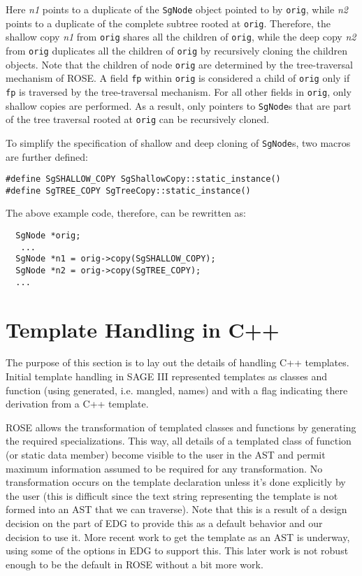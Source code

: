 Here {\it n1} points to a duplicate of the {\tt SgNode} object pointed to by {\tt orig},
while {\it n2} points to a duplicate of the complete subtree rooted at {\tt orig}.
Therefore, the shallow copy {\it n1} from {\tt orig} shares all the children 
of {\tt orig}, while the deep copy {\it n2} from {\tt orig} duplicates all the children 
of {\tt orig} by recursively cloning the children objects. 
Note that the children of node {\tt orig} are determined by the tree-traversal
mechanism of ROSE. A field {\tt fp} within {\tt orig} is considered a child of {\tt orig}
only if {\tt fp} is traversed by the tree-traversal mechanism. 
For all other fields in {\tt orig}, only shallow copies are performed. 
As a result, only pointers to {\tt SgNode}s that are part of
the tree traversal rooted at {\tt orig} can be recursively cloned. 
 
To simplify the specification of shallow and deep cloning
of {\tt SgNode}s, two macros are further defined:

{\indent
{\mySmallFontSize

\begin{verbatim}
#define SgSHALLOW_COPY SgShallowCopy::static_instance()
#define SgTREE_COPY SgTreeCopy::static_instance()
\end{verbatim}
}}

The above example code, therefore, can be rewritten as:

{\indent
{\mySmallFontSize

\begin{verbatim}
  SgNode *orig;
   ...
  SgNode *n1 = orig->copy(SgSHALLOW_COPY);
  SgNode *n2 = orig->copy(SgTREE_COPY);
  ...
\end{verbatim}
}}

\section{ Template Handling in C++}

   The purpose
of this section is to lay out the details of handling C++ templates.
Initial template handling in SAGE III represented templates as classes and function
(using generated, i.e. mangled, names) and with a flag indicating there derivation 
from a C++ template.

   ROSE allows the transformation of templated classes and
functions by generating the required specializations.  This way, all details of 
a templated class of function (or static data member) become visible to the user in
the AST and permit maximum information assumed to be required for any transformation.
No transformation occurs on the template declaration unless it's done explicitly by 
the user (this is difficult since the text string representing the template is not
formed into an AST that we can traverse).  Note that this is a result of a design
decision on the part of EDG to provide this as a default behavior and our decision 
to use it.  More recent work to get the template as an AST is underway, using some 
of the options in EDG to support this.  This later work is not robust enough to be 
the default in ROSE without a bit more work.

